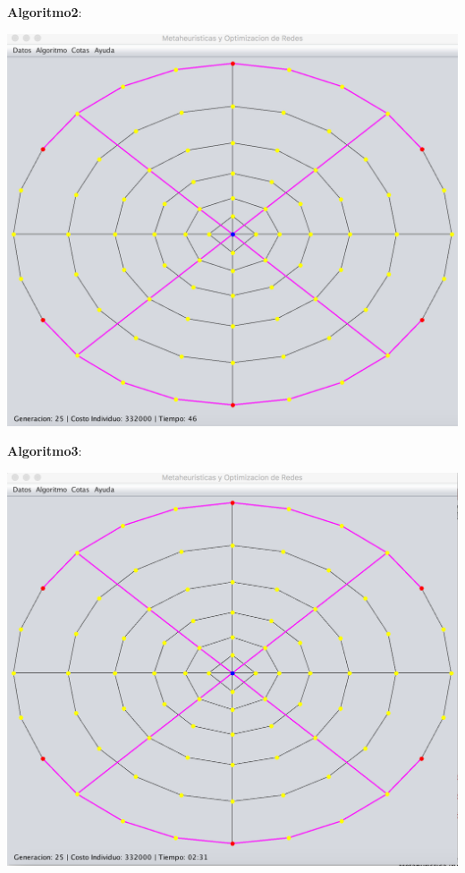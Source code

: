 \documentclass{extarticle}
\begin{document}
\textbf{Algoritmo2}:
\begin{center}
	\includegraphics[scale=0.4]{img/metaheuristica/i3_s2}
\end{center}

\textbf{Algoritmo3}:
\begin{center}
	\includegraphics[scale=0.4]{img/metaheuristica/i3_s3}
\end{center}
\end{document}
